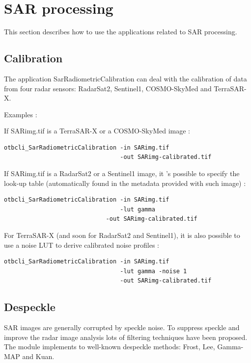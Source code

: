 \newpage
\section{SAR processing}\label{sec:sarprocessing}

This section describes how to use the applications related to SAR processing.

\subsection{Calibration}

The application SarRadiometricCalibration can deal with the calibration of data from four radar sensors:
RadarSat2, Sentinel1, COSMO-SkyMed and TerraSAR-X.

Examples :

If SARimg.tif is a TerraSAR-X or a COSMO-SkyMed image :

\begin{verbatim} 
otbcli_SarRadiometricCalibration -in SARimg.tif 
                                 -out SARimg-calibrated.tif 
\end{verbatim}
									  
If SARimg.tif is a RadarSat2 or a Sentinel1 image, it 's possible to specify the look-up table 
(automatically found in the metadata provided with such image) :

\begin{verbatim} 
otbcli_SarRadiometricCalibration -in SARimg.tif 
                                 -lut gamma
	                         -out SARimg-calibrated.tif 
\end{verbatim}

For TerraSAR-X (and soon for RadarSat2 and Sentinel1), it is also possible
to use a noise LUT to derive calibrated noise profiles :

\begin{verbatim} 
otbcli_SarRadiometricCalibration -in SARimg.tif 
                                 -lut gamma -noise 1
                                 -out SARimg-calibrated.tif 
\end{verbatim}

\subsection{Despeckle}
SAR images are generally corrupted by speckle noise. To suppress speckle and
improve the radar image analysis lots of filtering techniques have been
proposed.  The module implements to well-known despeckle methods: Frost, Lee,
Gamma-MAP and Kuan.

